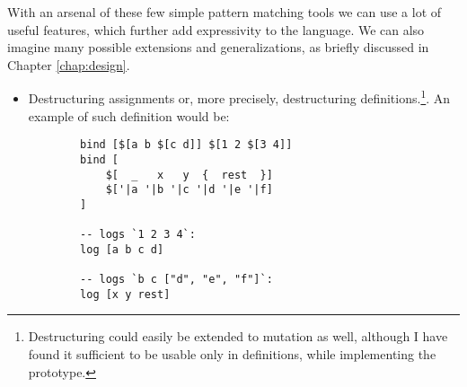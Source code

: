 With an arsenal of these few simple pattern matching tools we can use a lot of useful features, which further add expressivity to the language. We can also imagine many possible extensions and generalizations, as briefly discussed in Chapter \ref{chap:design}.

\begin{itemize}
    \item Destructuring assignments or, more precisely, destructuring definitions.\footnote{Destructuring could easily be extended to mutation as well, although I have found it sufficient to be usable only in definitions, while implementing the prototype.}. An example of such definition would be:
    \begin{lstlisting}
        bind [$[a b $[c d]] $[1 2 $[3 4]]
        bind [
            $[  _   x   y  {  rest  }]
            $['|a '|b '|c '|d '|e '|f]
        ]
        
        -- logs `1 2 3 4`:
        log [a b c d]
        
        -- logs `b c ["d", "e", "f"]`:
        log [x y rest]
    \end{lstlisting}
\end{itemize}


